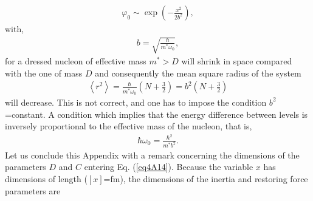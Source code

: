 \begin{subappendices}
\begin{align}\label{eq4A15}
\varphi_0\sim\exp\left(-\frac{x^2}{2b^2}\right),
\end{align}
with,
\begin{align}\label{eq4A16}
b=\sqrt{\frac{\hbar}{m^*\omega_0}},
\end{align}
for a dressed nucleon of effective mass $m^*>D$ will shrink in space compared with the one of mass $D$ and consequently the mean square radius of the system
\begin{align}\label{eq4A17}
\left\langle r^2\right\rangle=\frac{\hbar}{m^*\omega_0}\left(N+\frac{3}{2}\right)=b^2\left(N+\frac{3}{2}\right)
\end{align}
will decrease. This is not correct, and one has to impose the condition $b^2$=constant. A condition which implies that the energy difference between levels is inversely proportional to the effective mass of the nucleon, that is,
\begin{align}\label{eq4A18x}
\hbar\omega_0=\frac{\hbar^2}{m^*b^2}.
\end{align}
Let us conclude this Appendix with a remark concerning the dimensions of the parameters $D$ and $C$ entering Eq. (\ref{eq4A14}). Because the variable $x$ has dimensions of length ($[x]$=fm), the dimensions of the inertia and restoring force parameters are


\end{subappendices}
